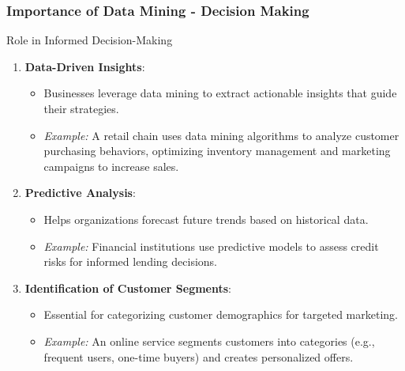 \documentclass[aspectratio=169]{beamer}
\begin{document}
\begin{frame}[fragile]
    \frametitle{Importance of Data Mining - Decision Making}
    \begin{block}{Role in Informed Decision-Making}
        \begin{enumerate}
            \item \textbf{Data-Driven Insights}:
                \begin{itemize}
                    \item Businesses leverage data mining to extract actionable insights that guide their strategies.
                    \item \textit{Example:} A retail chain uses data mining algorithms to analyze customer purchasing behaviors, optimizing inventory management and marketing campaigns to increase sales.
                \end{itemize}
            \item \textbf{Predictive Analysis}:
                \begin{itemize}
                    \item Helps organizations forecast future trends based on historical data.
                    \item \textit{Example:} Financial institutions use predictive models to assess credit risks for informed lending decisions.
                \end{itemize}
            \item \textbf{Identification of Customer Segments}:
                \begin{itemize}
                    \item Essential for categorizing customer demographics for targeted marketing.
                    \item \textit{Example:} An online service segments customers into categories (e.g., frequent users, one-time buyers) and creates personalized offers.
                \end{itemize}
        \end{enumerate}
    \end{block}
\end{frame}
\end{document}
